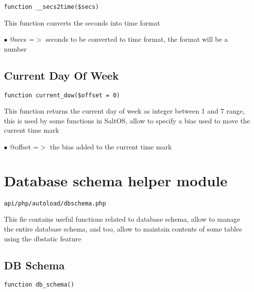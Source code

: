\documentclass[a4paper]{book}
\begin{document}
\begin{lstlisting}
function __secs2time($secs)
\end{lstlisting}

This function converts the seconds into time format

\begin{compactitem}
\item[\color{myblue}$\bullet$] @secs =$>$ seconds to be converted to time format, the format will be a number
\end{compactitem}

\hypertarget{toc85}{}
\subsection{Current Day Of Week}

\begin{lstlisting}
function current_dow($offset = 0)
\end{lstlisting}

This function returns the current day of week as integer between 1 and 7
range, this is used by some functions in SaltOS, allow to specify a bias
used to move the current time mark

\begin{compactitem}
\item[\color{myblue}$\bullet$] @offset =$>$ the bias added to the current time mark
\end{compactitem}

\hypertarget{toc86}{}
\section{Database schema helper module}

\begin{lstlisting}
api/php/autoload/dbschema.php
\end{lstlisting}

This fie contains useful functions related to database schema, allow to manage the entire database
schema, and too, allow to maintain contents of some tables using the dbstatic feature

\hypertarget{toc87}{}
\subsection{DB Schema}

\begin{lstlisting}
function db_schema()
\end{lstlisting}
\end{document}
